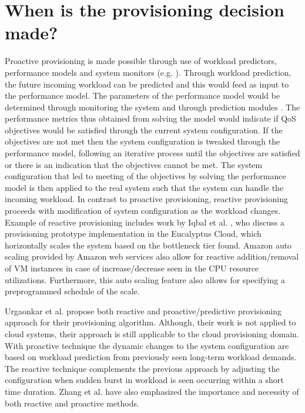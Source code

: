 \documentclass[10pt,journal,cspaper,compsoc]{IEEEtran}
\begin{document}
\section{When is the provisioning decision made?}
\label{sec:ReactiveProactiveProv}
Proactive provisioning is made possible through use of workload predictors, performance models and system monitors (e.g.  \cite{calheirosvirtual3}). Through workload prediction, the future incoming workload can be predicted and this would feed as input to the performance model. The parameters of the performance model would be determined through monitoring the system and through prediction modules \cite{calheirosvirtual3}. The  performance metrics thus obtained from solving the model would indicate if QoS objectives would be satisfied through the current system configuration. If the objectives are not met then the system configuration is tweaked through the performance model, following an iterative process until the objectives are satisfied or there is an indication that the objectives cannot be met. The system configuration that led to meeting of the objectives by solving the performance model is then applied to the real system such that the system can handle the incoming workload. In contrast to proactive provisioning, reactive provisioning proceeds with modification of system configuration as the workload changes. Example of reactive provisioning includes work by Iqbal et al. \cite{iqbal2010sla6}, who discuss a provisioning prototype implementation in the Eucalyptus Cloud, which horizontally scales the system based on the bottleneck tier found. Amazon auto scaling \cite{AmazonAutoScaling} provided by Amazon web services also allow for reactive addition/removal of VM instances in case of increase/decrease seen in the CPU resource utilizations. Furthermore, this auto scaling feature also allows for specifying a preprogrammed schedule of the scale.

Urgaonkar et al. \cite{urgaonkar2008agile10} propose both reactive and proactive/predictive provisioning approach for their provisioning algorithm. Although, their work is not applied to cloud systems, their approach is still applicable to the cloud provisioning domain. With proactive technique the dynamic changes to the system configuration are based on workload prediction from previously seen long-term workload demands. The reactive technique complements the previous approach by adjusting the configuration when sudden burst in workload is seen occurring within a short time duration. Zhang et al. \cite{zhang2010cloud13} have also emphasized the importance and necessity of both reactive and proactive methods. 
\end{document}
